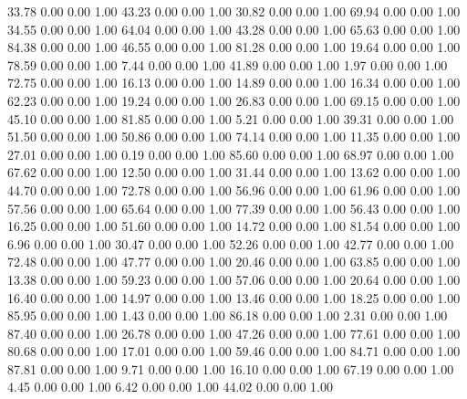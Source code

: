    33.78   0.00   0.00   1.00
   43.23   0.00   0.00   1.00
   30.82   0.00   0.00   1.00
   69.94   0.00   0.00   1.00
   34.55   0.00   0.00   1.00
   64.04   0.00   0.00   1.00
   43.28   0.00   0.00   1.00
   65.63   0.00   0.00   1.00
   84.38   0.00   0.00   1.00
   46.55   0.00   0.00   1.00
   81.28   0.00   0.00   1.00
   19.64   0.00   0.00   1.00
   78.59   0.00   0.00   1.00
    7.44   0.00   0.00   1.00
   41.89   0.00   0.00   1.00
    1.97   0.00   0.00   1.00
   72.75   0.00   0.00   1.00
   16.13   0.00   0.00   1.00
   14.89   0.00   0.00   1.00
   16.34   0.00   0.00   1.00
   62.23   0.00   0.00   1.00
   19.24   0.00   0.00   1.00
   26.83   0.00   0.00   1.00
   69.15   0.00   0.00   1.00
   45.10   0.00   0.00   1.00
   81.85   0.00   0.00   1.00
    5.21   0.00   0.00   1.00
   39.31   0.00   0.00   1.00
   51.50   0.00   0.00   1.00
   50.86   0.00   0.00   1.00
   74.14   0.00   0.00   1.00
   11.35   0.00   0.00   1.00
   27.01   0.00   0.00   1.00
    0.19   0.00   0.00   1.00
   85.60   0.00   0.00   1.00
   68.97   0.00   0.00   1.00
   67.62   0.00   0.00   1.00
   12.50   0.00   0.00   1.00
   31.44   0.00   0.00   1.00
   13.62   0.00   0.00   1.00
   44.70   0.00   0.00   1.00
   72.78   0.00   0.00   1.00
   56.96   0.00   0.00   1.00
   61.96   0.00   0.00   1.00
   57.56   0.00   0.00   1.00
   65.64   0.00   0.00   1.00
   77.39   0.00   0.00   1.00
   56.43   0.00   0.00   1.00
   16.25   0.00   0.00   1.00
   51.60   0.00   0.00   1.00
   14.72   0.00   0.00   1.00
   81.54   0.00   0.00   1.00
    6.96   0.00   0.00   1.00
   30.47   0.00   0.00   1.00
   52.26   0.00   0.00   1.00
   42.77   0.00   0.00   1.00
   72.48   0.00   0.00   1.00
   47.77   0.00   0.00   1.00
   20.46   0.00   0.00   1.00
   63.85   0.00   0.00   1.00
   13.38   0.00   0.00   1.00
   59.23   0.00   0.00   1.00
   57.06   0.00   0.00   1.00
   20.64   0.00   0.00   1.00
   16.40   0.00   0.00   1.00
   14.97   0.00   0.00   1.00
   13.46   0.00   0.00   1.00
   18.25   0.00   0.00   1.00
   85.95   0.00   0.00   1.00
    1.43   0.00   0.00   1.00
   86.18   0.00   0.00   1.00
    2.31   0.00   0.00   1.00
   87.40   0.00   0.00   1.00
   26.78   0.00   0.00   1.00
   47.26   0.00   0.00   1.00
   77.61   0.00   0.00   1.00
   80.68   0.00   0.00   1.00
   17.01   0.00   0.00   1.00
   59.46   0.00   0.00   1.00
   84.71   0.00   0.00   1.00
   87.81   0.00   0.00   1.00
    9.71   0.00   0.00   1.00
   16.10   0.00   0.00   1.00
   67.19   0.00   0.00   1.00
    4.45   0.00   0.00   1.00
    6.42   0.00   0.00   1.00
   44.02   0.00   0.00   1.00
